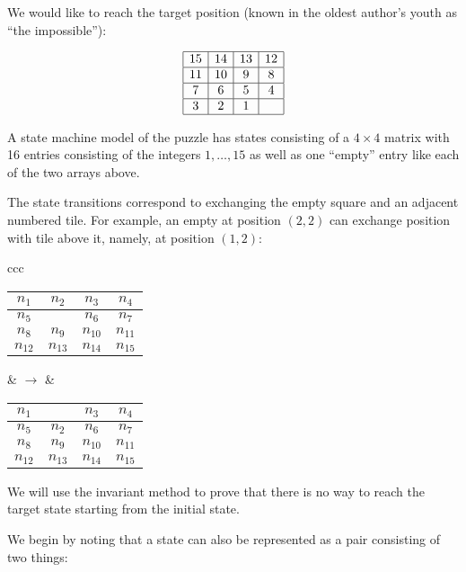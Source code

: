 \documentclass[14pt]{extarticle}
\begin{document}
We would like to reach the target position (known in the oldest author’s youth as “the impossible”):

$$
\begin{array}{|c|c|c|c|}
\hline
15 & 14 & 13 & 12 \\
\hline 
11 & 10 & 9 & 8 \\
\hline 
7 & 6 & 5 & 4 \\
\hline 
3 & 2 & 1 &  \\
\hline 
\end{array}
$$

A state machine model of the puzzle has states consisting of a $4 \times 4$ matrix with 16 entries consisting of the integers $1, \ldots, 15$ as well as one “empty” entry like each of the two arrays above.

The state transitions correspond to exchanging the empty square and an adjacent numbered tile. For example, an empty at position $(2,2)$ can exchange position with tile above it, namely, at position $(1,2)$:

\begin{center}
\begin{tabular}{ccc}
\begin{tabular}{|c|c|c|c|}
\hline
$n_1$ & $n_2$ & $n_3$ & $n_4$ \\
\hline 
$n_5$ &       & $n_6$ & $n_7$ \\
\hline 
$n_8$ & $n_9$ & $n_{10}$ & $n_{11}$ \\
\hline 
$n_{12}$ & $n_{13}$ & $n_{14}$ & $n_{15}$ \\
\hline 
\end{tabular}

 & $\longrightarrow$ &
\begin{tabular}{|c|c|c|c|}
\hline
$n_1$ &       & $n_3$ & $n_4$ \\
\hline 
$n_5$ & $n_2$ & $n_6$ & $n_7$ \\
\hline 
$n_8$ & $n_9$ & $n_{10}$ & $n_{11}$ \\
\hline 
$n_{12}$ & $n_{13}$ & $n_{14}$ & $n_{15}$ \\
\hline 
\end{tabular}
\end{tabular}
\end{center}

We will use the invariant method to prove that there is no way to reach the target state starting from the initial state.

We begin by noting that a state can also be represented as a pair consisting of two things:
\end{document}
